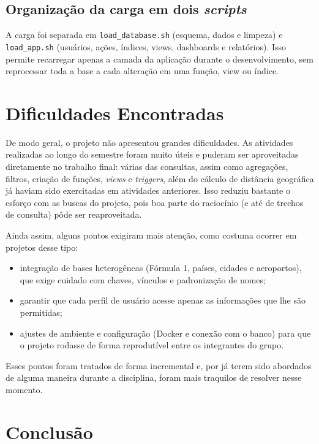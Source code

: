 \documentclass[12pt,a4paper]{article}
\begin{document}
\subsection{Organização da carga em dois \textit{scripts}}

A carga foi separada em \texttt{load\_database.sh} (esquema, dados e limpeza) e \texttt{load\_app.sh} (usuários, ações, índices, views, dashboards e relatórios). Isso permite recarregar apenas a camada da aplicação durante o desenvolvimento, sem reprocessar toda a base a cada alteração em uma função, view ou índice.

\section{Dificuldades Encontradas}

De modo geral, o projeto não apresentou grandes dificuldades. As atividades realizadas ao longo do semestre foram muito úteis e puderam ser aproveitadas diretamente no trabalho final: várias das consultas, assim como agregações, filtros, criação de funções, \textit{views} e \textit{triggers}, além do cálculo de distância geográfica já haviam sido exercitadas em atividades anteriores. Isso reduziu bastante o esforço com as buscas do projeto, pois boa parte do raciocínio (e até de trechos de consulta) pôde ser reaproveitada.

Ainda assim, alguns pontos exigiram mais atenção, como costuma ocorrer em projetos desse tipo:

\begin{itemize}
    \item integração de bases heterogêneas (Fórmula 1, países, cidades e aeroportos), que exige cuidado com chaves, vínculos e padronização de nomes;
    \item garantir que cada perfil de usuário acesse apenas as informações que lhe são permitidas;
    \item ajustes de ambiente e configuração (Docker e conexão com o banco) para que o projeto rodasse de forma reprodutível entre os integrantes do grupo.
\end{itemize}

Esses pontos foram tratados de forma incremental e, por já terem sido abordados de alguma maneira durante a disciplina, foram mais traquilos de resolver nesse momento. 
\section{Conclusão}
\end{document}
